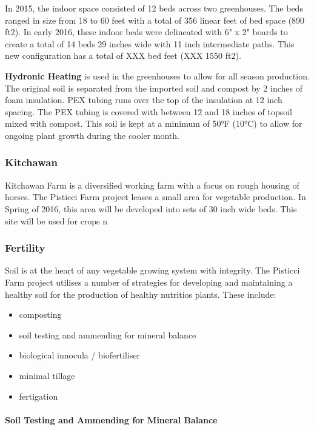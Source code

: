 In 2015, the indoor space consisted of 12 beds across two greenhouses.
The beds ranged in size from 18 to 60 feet with a total of 356 linear
feet of bed space (890 ft2). In early 2016, these indoor beds were
delineated with 6" x 2" boards to create a total of 14 beds 29 inches
wide with 11 inch intermediate paths. This new configuration has a total
of XXX bed feet (XXX 1550 ft2).

\textbf{Hydronic Heating} is used in the greenhouses to allow for all
season production. The original soil is separated from the imported soil
and compost by 2 inches of foam insulation. PEX tubing runs over the top
of the insulation at 12 inch spacing. The PEX tubing is covered with
between 12 and 18 inches of topsoil mixed with compost. This soil is
kept at a minimum of 50°F (10°C) to allow for ongoing plant growth
during the cooler month.

\subsubsection{Kitchawan}\label{kitchawan}

Kitchawan Farm is a diversified working farm with a focus on rough
housing of horses. The Pisticci Farm project leases a small area for
vegetable production. In Spring of 2016, this area will be developed
into sets of 30 inch wide beds. This site will be used for crops n

\subsubsection{Fertility}\label{fertility}

Soil is at the heart of any vegetable growing system with integrity. The
Pisticci Farm project utilises a number of strategies for developing and
maintaining a healthy soil for the production of healthy nutritios
plants. These include:

\begin{itemize}
\itemsep1pt\parskip0pt
\item
  composting
\item
  soil testing and ammending for mineral balance
\item
  biological innocula / biofertiliser
\item
  minimal tillage
\item
  fertigation
\end{itemize}

\paragraph{Soil Testing and Ammending for Mineral
Balance}\label{soil-testing-and-ammending-for-mineral-balance}

